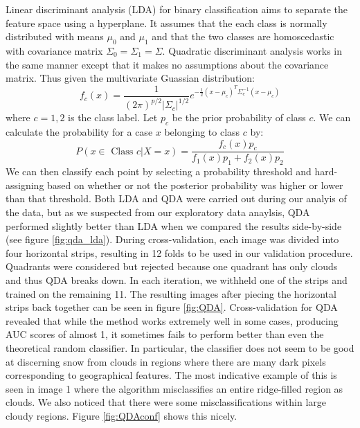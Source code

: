 \documentclass{article}\usepackage[]{graphicx}\usepackage[]{color}
\begin{document}
Linear discriminant analysis (LDA) for binary classification aims to separate the feature space using a hyperplane.  It assumes that the each class is normally distributed with means $\mu_0$ and $\mu_1$ and that the two classes are homoscedastic with covariance matrix $\Sigma_0=\Sigma_1=\Sigma$.  Quadratic discriminant analysis works in the same manner except that it makes no assumptions about the covariance matrix.  Thus given the multivariate Guassian distribution:
\begin{equation}
f_c(x) = \frac{1}{(2 \pi)^{p/2} \vert \Sigma_c \vert ^{1/2}} e^{-\frac{1}{2}(x-\mu_c)^T \Sigma_c^{-1} (x-\mu_c)}
\end{equation}
where $c=1,2$ is the class label.  Let $p_c$ be the prior probability of class $c$.  We can calculate the probability for a case $x$ belonging to class $c$ by:
\begin{equation}
P(x \in \textrm{ Class } c \vert X=x) = \frac{f_c(x) p_c}{f_1(x) p_1 + f_2(x) p_2}
\end{equation}
We can then classify each point by selecting a probability threshold and hard-assigning based on whether or not the posterior probability was higher or lower than that threshold.  Both LDA and QDA were carried out during our analyis of the data, but as we suspected from our exploratory data anaylsis, QDA performed slightly better than LDA when we compared the results side-by-side (see figure \ref{fig:qda_lda}).
During cross-validation, each image was divided into four horizontal strips, resulting in 12 folds to be used in our validation procedure.  Quadrants were considered but rejected because one quadrant has only clouds and thus QDA breaks down. In each iteration, we withheld one of the strips and trained on the remaining 11.  The resulting images after piecing the horizontal strips back together can be seen in figure \ref{fig:QDA}.
Cross-validation for QDA revealed that while the method works extremely well in some cases, producing AUC scores of almost 1, it sometimes fails to perform better than even the theoretical random classifier.  In particular, the classifier does not seem to be good at discerning snow from clouds in regions where there are many dark pixels corresponding to geographical features.  The most indicative example of this is seen in image 1 where the algorithm misclassifies an entire ridge-filled region as clouds.  We also noticed that there were some misclassifications within large cloudy regions.  Figure \ref{fig:QDAconf} shows this nicely.
\end{document}
